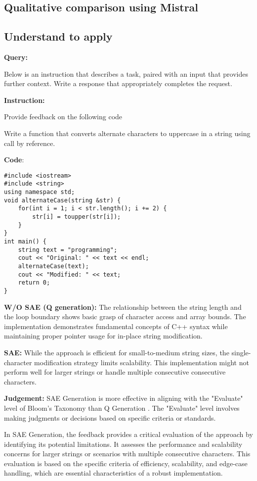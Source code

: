 \subsection{Qualitative comparison using Mistral}
\medskip
\subsection*{Understand to apply}
\textbf{Query:}

Below is an instruction that describes a task, paired with an input that provides further context. Write a response that appropriately completes the request.\par
\textbf{Instruction:}\par
Provide feedback on the following code \par
Write a function that converts alternate characters to uppercase in a string using call by reference.\par

\textbf{Code}:
\begin{lstlisting}
#include <iostream>
#include <string>
using namespace std;
void alternateCase(string &str) {
    for(int i = 1; i < str.length(); i += 2) {
        str[i] = toupper(str[i]);
    }
}
int main() {
    string text = "programming";
    cout << "Original: " << text << endl;
    alternateCase(text);
    cout << "Modified: " << text;
    return 0;
}
\end{lstlisting}
\textbf{W/O SAE (Q generation):} The relationship between the string length and the loop boundary shows basic grasp of character access and array bounds. The implementation demonstrates fundamental concepts of C++ syntax while maintaining proper pointer usage for in-place string modification. \par

\textbf{SAE:} While the approach is efficient for small-to-medium string sizes, the single-character modification strategy limits scalability. This implementation might not perform well for larger strings or handle multiple consecutive consecutive characters.  \par
\textbf{Judgement:}  SAE Generation is more effective in aligning with the "Evaluate" level of Bloom's Taxonomy than Q Generation . The "Evaluate" level involves making judgments or decisions based on specific criteria or standards.

In SAE Generation, the feedback provides a critical evaluation of the approach by identifying its potential limitations. It assesses the performance and scalability concerns for larger strings or scenarios with multiple consecutive characters. This evaluation is based on the specific criteria of efficiency, scalability, and edge-case handling, which are essential characteristics of a robust implementation.



